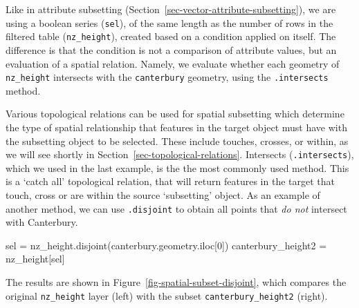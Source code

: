 \documentclass[
  letterpaper,
]{krantz}
\newenvironment{Shaded}{\begin{snugshade}}{\end{snugshade}}
\newcommand{\DecValTok}[1]{\textcolor[rgb]{0.68,0.00,0.00}{#1}}
\newcommand{\NormalTok}[1]{\textcolor[rgb]{0.00,0.23,0.31}{#1}}
\newcommand{\OperatorTok}[1]{\textcolor[rgb]{0.37,0.37,0.37}{#1}}
\begin{document}
Like in attribute subsetting
(Section~\ref{sec-vector-attribute-subsetting}), we are using a boolean
series (\texttt{sel}), of the same length as the number of rows in the
filtered table (\texttt{nz\_height}), created based on a condition
applied on itself. The difference is that the condition is not a
comparison of attribute values, but an evaluation of a spatial relation.
Namely, we evaluate whether each geometry of \texttt{nz\_height}
intersects with the \texttt{canterbury} geometry, using the
\texttt{.intersects} method.

Various topological relations can be used for spatial subsetting which
determine the type of spatial relationship that features in the target
object must have with the subsetting object to be selected. These
include touches, crosses, or within, as we will see shortly in
Section~\ref{sec-topological-relations}. Intersects
(\texttt{.intersects}), which we used in the last example, is the the
most commonly used method. This is a `catch all' topological relation,
that will return features in the target that touch, cross or are within
the source `subsetting' object. As an example of another method, we can
use \texttt{.disjoint} to obtain all points that \emph{do not} intersect
with Canterbury.

\begin{Shaded}
\begin{Highlighting}[]
\NormalTok{sel }\OperatorTok{=}\NormalTok{ nz\_height.disjoint(canterbury.geometry.iloc[}\DecValTok{0}\NormalTok{])}
\NormalTok{canterbury\_height2 }\OperatorTok{=}\NormalTok{ nz\_height[sel]}
\end{Highlighting}
\end{Shaded}

The results are shown in Figure~\ref{fig-spatial-subset-disjoint}, which
compares the original \texttt{nz\_height} layer (left) with the subset
\texttt{canterbury\_height2} (right).
\end{document}

